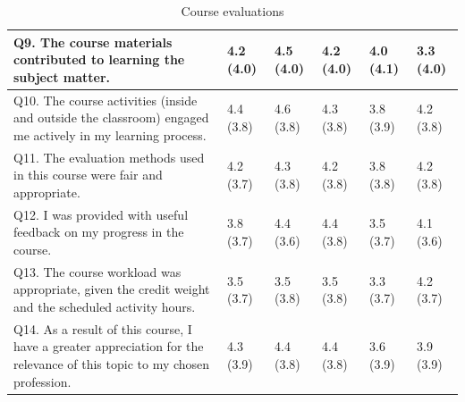 \begin{table}[htb]
\begin{tabular}{@{}p{9cm}p{1.1cm}p{1.1cm}p{1.1cm}p{1.1cm}p{1.1cm}@{}}
Q9. The course materials contributed to learning the subject matter. & 4.2 \newline (4.0)  & 4.5 \newline (4.0) & 
4.2 \newline (4.0)   & 4.0 \newline (4.1) & 3.3 \newline (4.0)  \\ \midrule

Q10. The course activities (inside and outside the classroom) engaged me actively in my learning process. & 4.4 \newline (3.8)  & 4.6 \newline (3.8) & 4.3 \newline (3.8)  & 3.8 \newline (3.9) & 4.2 \newline (3.8)  \\ \midrule

Q11. The evaluation methods used in this course were fair and appropriate. & 4.2 \newline (3.7)  & 4.3 \newline (3.8) & 
4.2 \newline (3.8)  & 3.8 \newline (3.8)  & 4.2 \newline (3.8) \\ \midrule

Q12. I was provided with useful feedback on my progress in the course. & 3.8 \newline (3.7)  & 4.4 \newline (3.6)  & 
4.4 \newline (3.8)  & 3.5 \newline (3.7)  & 4.1 \newline (3.6) \\ \midrule

Q13. The course workload was appropriate, given the credit weight and the scheduled activity hours. & 3.5 \newline (3.7)  & 3.5 \newline (3.8)  & 3.5 \newline (3.8)  & 3.3 \newline (3.7)  & 4.2 \newline (3.7) \\ \midrule

Q14. As a result of this course, I have a greater appreciation for the relevance of this topic to my chosen profession. & 4.3 \newline (3.9)  & 4.4 \newline (3.8)  & 4.4 \newline (3.8)  & 3.6 \newline (3.9)  & 3.9 \newline (3.9)  \\ \midrule

\bottomrule
\end{tabular}
\caption{Course evaluations}
\label{tab:course-eval}
\end{table}


